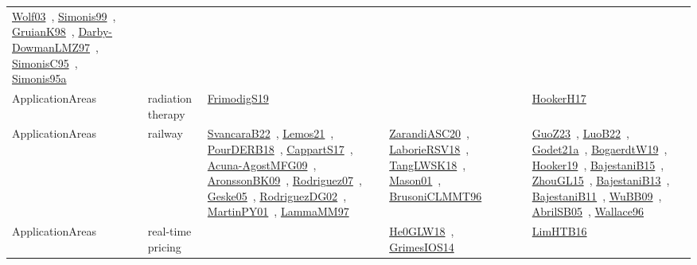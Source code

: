 {\begin{longtable}{lp{3cm}>{\raggedright\arraybackslash}p{6cm}>{\raggedright\arraybackslash}p{6cm}>{\raggedright\arraybackslash}p{8cm}}
\href{../works/Wolf03.pdf}{Wolf03}~\cite{Wolf03}, \href{../works/Simonis99.pdf}{Simonis99}~\cite{Simonis99}, \href{../works/GruianK98.pdf}{GruianK98}~\cite{GruianK98}, \href{../works/Darby-DowmanLMZ97.pdf}{Darby-DowmanLMZ97}~\cite{Darby-DowmanLMZ97}, \href{../works/SimonisC95.pdf}{SimonisC95}~\cite{SimonisC95}, \href{../works/Simonis95a.pdf}{Simonis95a}~\cite{Simonis95a}\\
ApplicationAreas & radiation therapy & \href{../works/FrimodigS19.pdf}{FrimodigS19}~\cite{FrimodigS19} &  & \href{../works/HookerH17.pdf}{HookerH17}~\cite{HookerH17}\\
ApplicationAreas & railway & \href{../works/SvancaraB22.pdf}{SvancaraB22}~\cite{SvancaraB22}, \href{../works/Lemos21.pdf}{Lemos21}~\cite{Lemos21}, \href{../works/PourDERB18.pdf}{PourDERB18}~\cite{PourDERB18}, \href{../works/CappartS17.pdf}{CappartS17}~\cite{CappartS17}, \href{../works/Acuna-AgostMFG09.pdf}{Acuna-AgostMFG09}~\cite{Acuna-AgostMFG09}, \href{../works/AronssonBK09.pdf}{AronssonBK09}~\cite{AronssonBK09}, \href{../works/Rodriguez07.pdf}{Rodriguez07}~\cite{Rodriguez07}, \href{../works/Geske05.pdf}{Geske05}~\cite{Geske05}, \href{../works/RodriguezDG02.pdf}{RodriguezDG02}~\cite{RodriguezDG02}, \href{../works/MartinPY01.pdf}{MartinPY01}~\cite{MartinPY01}, \href{../works/LammaMM97.pdf}{LammaMM97}~\cite{LammaMM97} & \href{../works/ZarandiASC20.pdf}{ZarandiASC20}~\cite{ZarandiASC20}, \href{../works/LaborieRSV18.pdf}{LaborieRSV18}~\cite{LaborieRSV18}, \href{../works/TangLWSK18.pdf}{TangLWSK18}~\cite{TangLWSK18}, \href{../works/Mason01.pdf}{Mason01}~\cite{Mason01}, \href{../works/BrusoniCLMMT96.pdf}{BrusoniCLMMT96}~\cite{BrusoniCLMMT96} & \href{../works/GuoZ23.pdf}{GuoZ23}~\cite{GuoZ23}, \href{../works/LuoB22.pdf}{LuoB22}~\cite{LuoB22}, \href{../works/Godet21a.pdf}{Godet21a}~\cite{Godet21a}, \href{../works/BogaerdtW19.pdf}{BogaerdtW19}~\cite{BogaerdtW19}, \href{../works/Hooker19.pdf}{Hooker19}~\cite{Hooker19}, \href{../works/BajestaniB15.pdf}{BajestaniB15}~\cite{BajestaniB15}, \href{../works/ZhouGL15.pdf}{ZhouGL15}~\cite{ZhouGL15}, \href{../works/BajestaniB13.pdf}{BajestaniB13}~\cite{BajestaniB13}, \href{../works/BajestaniB11.pdf}{BajestaniB11}~\cite{BajestaniB11}, \href{../works/WuBB09.pdf}{WuBB09}~\cite{WuBB09}, \href{../works/AbrilSB05.pdf}{AbrilSB05}~\cite{AbrilSB05}, \href{../works/Wallace96.pdf}{Wallace96}~\cite{Wallace96}\\
ApplicationAreas & real-time pricing &  & \href{../works/He0GLW18.pdf}{He0GLW18}~\cite{He0GLW18}, \href{../works/GrimesIOS14.pdf}{GrimesIOS14}~\cite{GrimesIOS14} & \href{../works/LimHTB16.pdf}{LimHTB16}~\cite{LimHTB16}\\

\end{longtable}}
